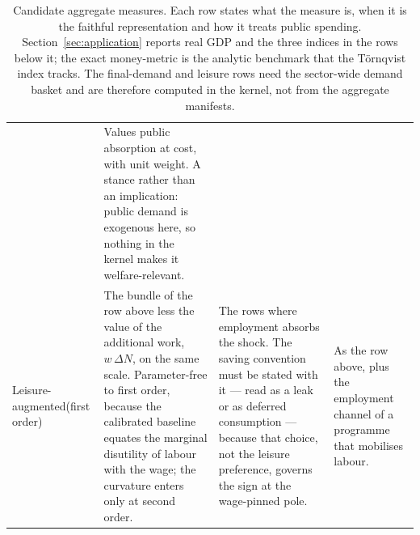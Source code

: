 \begin{table}[htbp]
\begin{tabular}{@{}>{\raggedright\arraybackslash}p{1.85cm}>{\raggedright\arraybackslash}p{3.9cm}>{\raggedright\arraybackslash}p{4.3cm}>{\raggedright\arraybackslash}p{4.3cm}@{}}
& Values public absorption at cost, with unit weight. A stance rather than an implication: public demand is exogenous here, so nothing in the kernel makes it welfare-relevant. \\
Leisure-augmented\newline \scriptsize (first order)
& The bundle of the row above less the value of the additional work, $w\,\Delta N$, on the same scale. Parameter-free to first order, because the calibrated baseline equates the marginal disutility of labour with the wage; the curvature enters only at second order.
& The rows where employment absorbs the shock. The saving convention must be stated with it --- read as a leak or as deferred consumption --- because that choice, not the leisure preference, governs the sign at the wage-pinned pole.
& As the row above, plus the employment channel of a programme that mobilises labour. \\
\bottomrule
\end{tabular}
\caption{Candidate aggregate measures. Each row states what the measure is,
when it is the faithful representation and how it treats public spending.
Section~\ref{sec:application} reports real GDP and the three indices in the
rows below it; the exact money-metric is the analytic benchmark that the
T\"ornqvist index tracks. The final-demand and leisure rows need the
sector-wide demand basket and are therefore computed in the kernel, not from
the aggregate manifests.}
\label{tab:welfare-measures}
\end{table}
